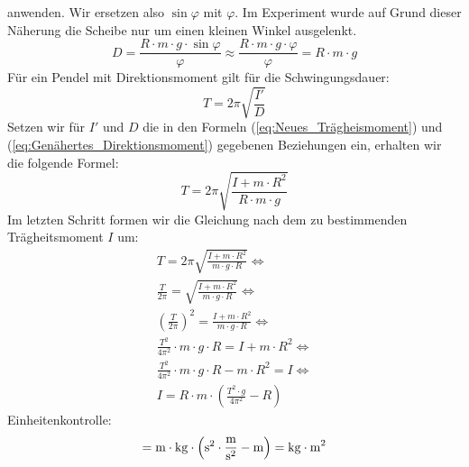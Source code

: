 \documentclass{article}
\begin{document}
				anwenden. Wir ersetzen also \( \sin \varphi \) mit \( \varphi \). Im Experiment wurde auf Grund dieser Näherung die Scheibe nur um einen kleinen Winkel ausgelenkt.
				\begin{equation}\label{eq:Genähertes_Direktionsmoment}
					D = \frac{ R \cdot m \cdot g \cdot \sin \varphi }{ \varphi } \approx \frac{ R \cdot m \cdot g \cdot \varphi }{ \varphi } = R \cdot m \cdot g
				\end{equation}
				Für ein Pendel mit Direktionsmoment gilt für die Schwingungsdauer:
				\begin{equation}
					T = 2 \pi \sqrt{ \frac{I'}{D} }
				\end{equation}
				Setzen wir für \(I'\) und \(D\) die in den Formeln (\ref{eq:Neues_Trägheismoment}) und (\ref{eq:Genähertes_Direktionsmoment}) gegebenen Beziehungen ein,
				erhalten wir die folgende Formel:
				\begin{equation}
					T = 2 \pi \sqrt{ \frac{ I + m \cdot R^2 }{ R \cdot m \cdot g } }
				\end{equation}
				Im letzten Schritt formen wir die Gleichung nach dem zu bestimmenden Trägheitsmoment \(I\) um:
				\begin{equation}
					\begin{gathered} \label{eq:Trägheitsmoment_Schwingung}
						T = 2 \pi \sqrt{ \frac{ I + m \cdot R^2 }{ m \cdot g \cdot R } } \Leftrightarrow \\
						\frac{T}{ 2 \pi } = \sqrt{ \frac{ I + m \cdot R^2 }{ m \cdot g \cdot R } } \Leftrightarrow \\
						{\left( \frac{T}{ 2 \pi } \right)}^2 = \frac{ I + m \cdot R^2 }{ m \cdot g \cdot R } \Leftrightarrow \\
						\frac{T^2}{4 \pi^2} \cdot m \cdot g \cdot R = I + m \cdot R^2 \Leftrightarrow \\
						\frac{T^2}{4 \pi^2} \cdot m \cdot g \cdot R - m \cdot R^2 = I \Leftrightarrow \\
						I = R \cdot m \cdot \left( \frac{T^2 \cdot g }{ 4 \pi^2 } - R \right)
					\end{gathered}
				\end{equation}
				Einheitenkontrolle:
				\begin{equation}
					[I] = \unit{\metre} \cdot \unit{\kilogram} \cdot \left( \unit{\second^2} \cdot \unit{\frac{\metre}{\second^2}} - \unit{\metre} \right) = \unit{\kilogram \cdot \metre^2}
				\end{equation}
\end{document}
